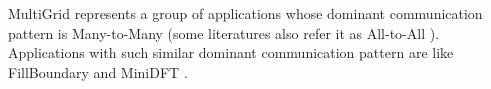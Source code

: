 \documentclass[conference]{IEEEtran}
\begin{document}
MultiGrid represents a group of applications whose dominant communication pattern is Many-to-Many (some literatures also refer it as All-to-All \cite{roth}).  Applications with such similar dominant communication pattern are like FillBoundary and MiniDFT \cite{design forward webpage}.




%
\end{document}
